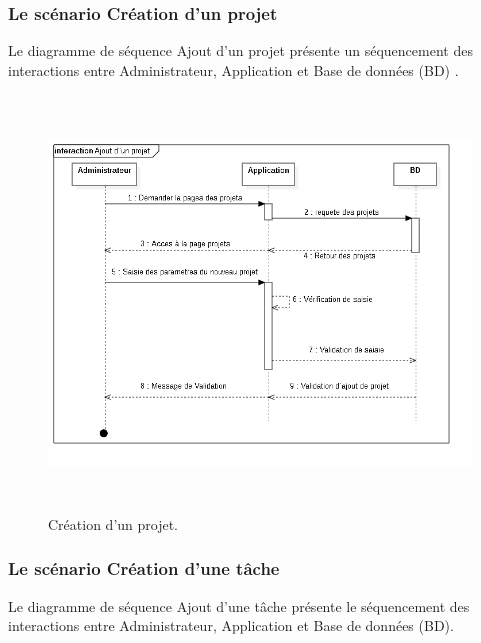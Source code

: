 \newpage
\subsubsection{  Le sc\'{e}nario \guillemotleft{} Cr\'{e}ation d'un projet \guillemotright{}}

Le diagramme de s\'{e}quence \guillemotleft{} Ajout d'un projet \guillemotright{} pr\'{e}sente un s\'{e}quencement
des interactions entre Administrateur, Application et Base de donn\'{e}es (BD) .


\begin{figure}[H]
\center
\includegraphics[width=14cm,height=11cm]{./figures/seq/B.png}
\caption{ Cr\'{e}ation d'un projet.}
\end{figure}

\newpage
\subsubsection{Le sc\'{e}nario \guillemotleft{} Cr\'{e}ation d'une t\^{a}che\guillemotright{}}
Le diagramme de s\'{e}quence \guillemotleft{} Ajout d'une t\^{a}che \guillemotright{} pr\'{e}sente le s\'{e}quencement
des interactions entre Administrateur, Application et Base de donn\'{e}es (BD).

